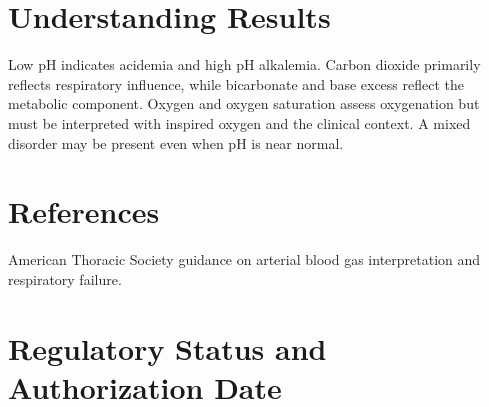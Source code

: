 \section*{Understanding Results}
Low pH indicates acidemia and high pH alkalemia. Carbon dioxide primarily reflects respiratory influence, while bicarbonate and base excess reflect the metabolic component. Oxygen and oxygen saturation assess oxygenation but must be interpreted with inspired oxygen and the clinical context. A mixed disorder may be present even when pH is near normal.

\section*{References}
American Thoracic Society guidance on arterial blood gas interpretation and respiratory failure.

\clearpage


\section*{Regulatory Status and Authorization Date}

\clearpage
